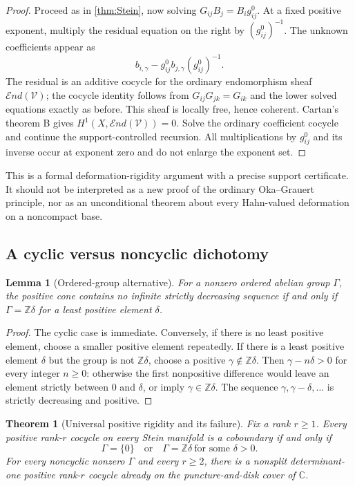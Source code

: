 \documentclass[11pt,letterpaper]{article}
\newtheorem{theorem}{Theorem}[section]
\newtheorem{lemma}[lemma]{Lemma}
\theoremstyle{definition}
\theoremstyle{remark}
\newcommand{\C}{\mathbb C}
\newcommand{\Z}{\mathbb Z}
\newcommand{\End}{\mathcal E nd}
\numberwithin{equation}{section}
\begin{document}
\begin{proof}
Proceed as in \cref{thm:Stein}, now solving $G_{ij}B_j=B_i g^0_{ij}$. At a fixed positive exponent, multiply the residual equation on the right by $(g^0_{ij})^{-1}$. The unknown coefficients appear as
\[
 b_{i,\gamma}-g^0_{ij}b_{j,\gamma}(g^0_{ij})^{-1}.
\]
The residual is an additive cocycle for the ordinary endomorphism sheaf $\End(\mathcal V)$; the cocycle identity follows from $G_{ij}G_{jk}=G_{ik}$ and the lower solved equations exactly as before. This sheaf is locally free, hence coherent. Cartan's theorem B gives $H^1(X,\End(\mathcal V))=0$. Solve the ordinary coefficient cocycle and continue the support-controlled recursion. All multiplications by $g^0_{ij}$ and its inverse occur at exponent zero and do not enlarge the exponent set.
\end{proof}

This is a formal deformation-rigidity argument with a precise support certificate. It should not be interpreted as a new proof of the ordinary Oka--Grauert principle, nor as an unconditional theorem about every Hahn-valued deformation on a noncompact base.

\subsection{A cyclic versus noncyclic dichotomy}

\begin{lemma}[Ordered-group alternative]\label{lem:groups}
For a nonzero ordered abelian group $\Gamma$, the positive cone contains no infinite strictly decreasing sequence if and only if $\Gamma=\Z\delta$ for a least positive element $\delta$.
\end{lemma}

\begin{proof}
The cyclic case is immediate. Conversely, if there is no least positive element, choose a smaller positive element repeatedly. If there is a least positive element $\delta$ but the group is not $\Z\delta$, choose a positive $\gamma\notin\Z\delta$. Then $\gamma-n\delta>0$ for every integer $n\geq0$: otherwise the first nonpositive difference would leave an element strictly between $0$ and $\delta$, or imply $\gamma\in\Z\delta$. The sequence $\gamma,\gamma-\delta,\ldots$ is strictly decreasing and positive.
\end{proof}

\begin{theorem}[Universal positive rigidity and its failure]\label{thm:dichotomy}
Fix a rank $r\geq1$. Every positive rank-$r$ cocycle on every Stein manifold is a coboundary if and only if
\[
 \Gamma=\{0\}\quad\text{or}\quad\Gamma=\Z\delta\ \text{for some }\delta>0.
\]
For every noncyclic nonzero $\Gamma$ and every $r\geq2$, there is a nonsplit determinant-one positive rank-$r$ cocycle already on the puncture-and-disk cover of $\C$.
\end{theorem}
\end{document}
